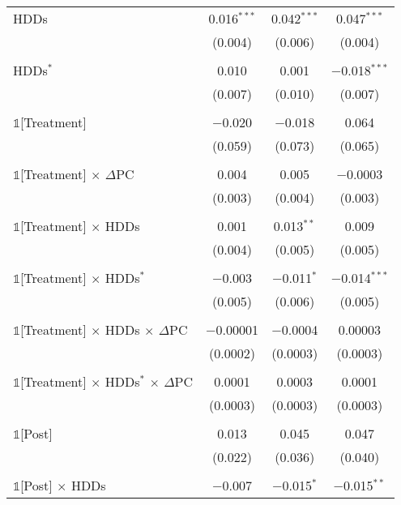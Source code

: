 {\begin{table}[t!]
\begin{ThreePartTable}
\begin{longtable}{@{\extracolsep{40pt}}lccc}
                HDDs & 0.016$^{***}$ & 0.042$^{***}$ & 0.047$^{***}$ \\
                & (0.004) & (0.006) & (0.004) \\
                & & & \\
                HDDs$^{*}$ & 0.010 & 0.001 & $-$0.018$^{***}$ \\
                & (0.007) & (0.010) & (0.007) \\
                & & & \\
                $\mathbb{1}$[Treatment] & $-$0.020 & $-$0.018 & 0.064 \\
                & (0.059) & (0.073) & (0.065) \\
                & & & \\
                $\mathbb{1}$[Treatment] $\times$ $\Delta$PC & 0.004 & 0.005 & $-$0.0003 \\
                & (0.003) & (0.004) & (0.003) \\
                & & & \\
                $\mathbb{1}$[Treatment] $\times$ HDDs & 0.001 & 0.013$^{**}$ & 0.009 \\
                & (0.004) & (0.005) & (0.005) \\
                & & & \\
                $\mathbb{1}$[Treatment] $\times$ HDDs$^{*}$ & $-$0.003 & $-$0.011$^{*}$ & $-$0.014$^{***}$ \\
                & (0.005) & (0.006) & (0.005) \\
                & & & \\
                $\mathbb{1}$[Treatment] $\times$ HDDs $\times$ $\Delta$PC & $-$0.00001 & $-$0.0004 & 0.00003 \\
                & (0.0002) & (0.0003) & (0.0003) \\
                & & & \\
                $\mathbb{1}$[Treatment] $\times$ HDDs$^{*}$ $\times$ $\Delta$PC & 0.0001 & 0.0003 & 0.0001 \\
                & (0.0003) & (0.0003) & (0.0003) \\
                & & & \\
                $\mathbb{1}$[Post] & 0.013 & 0.045 & 0.047 \\
                & (0.022) & (0.036) & (0.040) \\
                & & & \\
                $\mathbb{1}$[Post] $\times$ HDDs & $-$0.007 & $-$0.015$^{*}$ & $-$0.015$^{**}$ \\

\end{longtable}
\end{ThreePartTable}
\end{table}}
